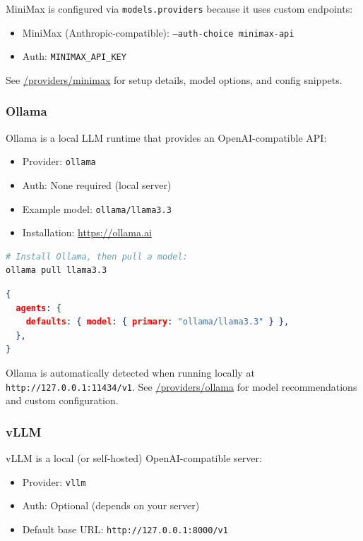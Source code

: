 MiniMax is configured via \texttt{models.providers} because it uses custom endpoints:

\begin{itemize}
  \item MiniMax (Anthropic‑compatible): \texttt{--auth-choice minimax-api}
  \item Auth: \texttt{MINIMAX\_API\_KEY}
\end{itemize}


See \href{/providers/minimax}{/providers/minimax} for setup details, model options, and config snippets.

\subsubsection{Ollama}


Ollama is a local LLM runtime that provides an OpenAI-compatible API:

\begin{itemize}
  \item Provider: \texttt{ollama}
  \item Auth: None required (local server)
  \item Example model: \texttt{ollama/llama3.3}
  \item Installation: \href{https://ollama.ai}{https://ollama.ai}
\end{itemize}


\begin{lstlisting}[language=bash]
# Install Ollama, then pull a model:
ollama pull llama3.3
\end{lstlisting}


\begin{lstlisting}[language=json]
{
  agents: {
    defaults: { model: { primary: "ollama/llama3.3" } },
  },
}
\end{lstlisting}


Ollama is automatically detected when running locally at \texttt{http://127.0.0.1:11434/v1}. See \href{/providers/ollama}{/providers/ollama} for model recommendations and custom configuration.

\subsubsection{vLLM}


vLLM is a local (or self-hosted) OpenAI-compatible server:

\begin{itemize}
  \item Provider: \texttt{vllm}
  \item Auth: Optional (depends on your server)
  \item Default base URL: \texttt{http://127.0.0.1:8000/v1}
\end{itemize}


